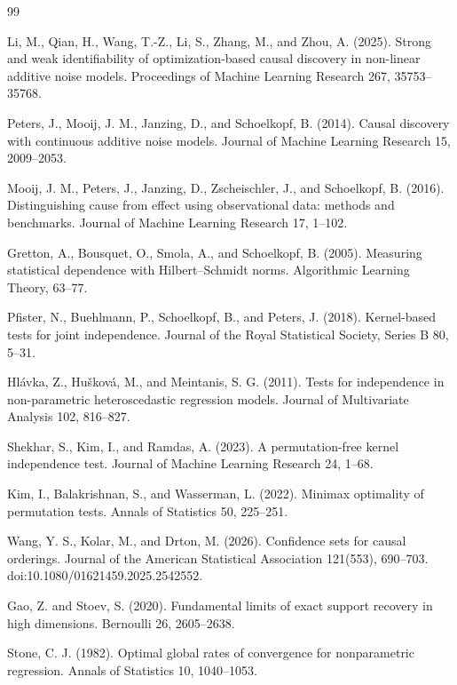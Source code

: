 \documentclass{article}
\begin{document}
\begin{thebibliography}{99}

   Li, M., Qian, H., Wang, T.-Z., Li, S., Zhang, M., and Zhou, A. (2025). Strong and weak identifiability of optimization-based causal discovery in non-linear additive noise models. Proceedings of Machine Learning Research 267, 35753--35768.

   Peters, J., Mooij, J. M., Janzing, D., and Schoelkopf, B. (2014). Causal discovery with continuous additive noise models. Journal of Machine Learning Research 15, 2009--2053.

   Mooij, J. M., Peters, J., Janzing, D., Zscheischler, J., and Schoelkopf, B. (2016). Distinguishing cause from effect using observational data: methods and benchmarks. Journal of Machine Learning Research 17, 1--102.

   Gretton, A., Bousquet, O., Smola, A., and Schoelkopf, B. (2005). Measuring statistical dependence with Hilbert--Schmidt norms. Algorithmic Learning Theory, 63--77.

   Pfister, N., Buehlmann, P., Schoelkopf, B., and Peters, J. (2018). Kernel-based tests for joint independence. Journal of the Royal Statistical Society, Series B 80, 5--31.

   Hl\'avka, Z., Hu\v{s}kov\'a, M., and Meintanis, S. G. (2011). Tests for independence in non-parametric heteroscedastic regression models. Journal of Multivariate Analysis 102, 816--827.

   Shekhar, S., Kim, I., and Ramdas, A. (2023). A permutation-free kernel independence test. Journal of Machine Learning Research 24, 1--68.

   Kim, I., Balakrishnan, S., and Wasserman, L. (2022). Minimax optimality of permutation tests. Annals of Statistics 50, 225--251.

   Wang, Y. S., Kolar, M., and Drton, M. (2026). Confidence sets for causal orderings. Journal of the American Statistical Association 121(553), 690--703. doi:10.1080/01621459.2025.2542552.

   Gao, Z. and Stoev, S. (2020). Fundamental limits of exact support recovery in high dimensions. Bernoulli 26, 2605--2638.

   Stone, C. J. (1982). Optimal global rates of convergence for nonparametric regression. Annals of Statistics 10, 1040--1053.


\end{thebibliography}
\end{document}
